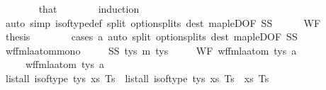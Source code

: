 \begin{isabellebody}
\ \ \ \ \ \ \isamarkupfalse%
\ that\isanewline
\ \ \ \ \ \ \isamarkupfalse%
\ induction\isanewline
\ \ \ \ \ \ \isamarkupfalse%
\ {\isacharparenleft}{\kern0pt}auto\ simp{\isacharcolon}{\kern0pt}\ is{\isacharunderscore}{\kern0pt}of{\isacharunderscore}{\kern0pt}type{\isacharunderscore}{\kern0pt}def\ split{\isacharcolon}{\kern0pt}\ option{\isachardot}{\kern0pt}splits\ dest{\isacharcolon}{\kern0pt}\ map{\isacharunderscore}{\kern0pt}leD{\isacharbrackleft}{\kern0pt}OF\ SS{\isacharbrackright}{\kern0pt}{\isacharparenright}{\kern0pt}\isanewline
\ \ \ \ \isamarkupfalse%
\ WF\ \isamarkupfalse%
\ {\isacharquery}{\kern0pt}thesis\isanewline
\ \ \ \ \ \ \isamarkupfalse%
\ {\isacharparenleft}{\kern0pt}cases\ a{\isacharparenright}{\kern0pt}\ {\isacharparenleft}{\kern0pt}auto\ split{\isacharcolon}{\kern0pt}\ option{\isachardot}{\kern0pt}splits\ dest{\isacharcolon}{\kern0pt}\ map{\isacharunderscore}{\kern0pt}leD{\isacharbrackleft}{\kern0pt}OF\ SS{\isacharbrackright}{\kern0pt}{\isacharparenright}{\kern0pt}\isanewline
\ \ \isamarkupfalse%
%
\endisatagproof
{\isafoldproof}%
%
\isadelimproof
\isanewline
%
\endisadelimproof
\isanewline
\ \ \isamarkupfalse%
\ wf{\isacharunderscore}{\kern0pt}fmla{\isacharunderscore}{\kern0pt}atom{\isacharunderscore}{\kern0pt}mono{\isacharcolon}{\kern0pt}\isanewline
\ \ \ \ \ SS{\isacharcolon}{\kern0pt}\ {\isachardoublequoteopen}tys\ {\isasymsubseteq}\isactrlsub m\ tys{\isacharprime}{\kern0pt}{\isachardoublequoteclose}\isanewline
\ \ \ \ \ WF{\isacharcolon}{\kern0pt}\ {\isachardoublequoteopen}wf{\isacharunderscore}{\kern0pt}fmla{\isacharunderscore}{\kern0pt}atom\ tys\ a{\isachardoublequoteclose}\isanewline
\ \ \ \ \ {\isachardoublequoteopen}wf{\isacharunderscore}{\kern0pt}fmla{\isacharunderscore}{\kern0pt}atom\ tys{\isacharprime}{\kern0pt}\ a{\isachardoublequoteclose}\isanewline
%
\isadelimproof
\ \ %
\endisadelimproof
%
\isatagproof
{}\isamarkupfalse%
\ {\isacharminus}{\kern0pt}\isanewline
\ \ \ \ \isamarkupfalse%
\ {\isachardoublequoteopen}list{\isacharunderscore}{\kern0pt}all{}\ {\isacharparenleft}{\kern0pt}is{\isacharunderscore}{\kern0pt}of{\isacharunderscore}{\kern0pt}type\ tys{\isacharprime}{\kern0pt}{\isacharparenright}{\kern0pt}\ xs\ Ts{\isachardoublequoteclose}\ \ {\isachardoublequoteopen}list{\isacharunderscore}{\kern0pt}all{}\ {\isacharparenleft}{\kern0pt}is{\isacharunderscore}{\kern0pt}of{\isacharunderscore}{\kern0pt}type\ tys{\isacharparenright}{\kern0pt}\ xs\ Ts{\isachardoublequoteclose}\ \ xs\ Ts\isanewline

\end{isabellebody}
